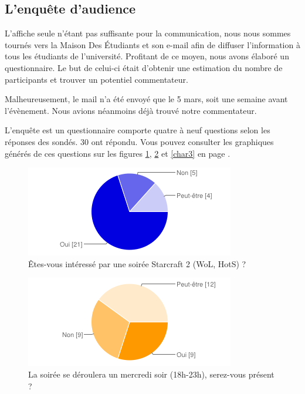 \subsection{L'enquête d'audience}%
\label{sub:l_enquete_d_audience}

L'affiche seule n'étant pas suffisante pour la communication, nous nous sommes tournés vers la
Maison Des Étudiants et son e-mail afin de diffuser l'information à tous les étudiants de l'université.
Profitant de ce moyen, nous avons élaboré un questionnaire. Le but de celui-ci était d'obtenir une estimation
du nombre de participants et trouver un potentiel commentateur.

Malheureusement, le mail n'a été envoyé que le 5 mars, soit une semaine avant l'évènement.
Nous avions néanmoins déjà trouvé notre commentateur.

L'enquête est un questionnaire comporte quatre à neuf questions selon
les réponses des sondés. 30 ont répondu.  Vous pouvez consulter les
graphiques générés de ces questions sur les figures \ref{char1},
\ref{char2} et \ref{char3} en page \pageref{char1}.

\begin{figure}
  \begin{center}
    \includegraphics[scale=1]{images/chart_1.png}
    \caption{Êtes-vous intéressé par une soirée Starcraft 2 (WoL, HotS) ?}
    \label{char1}
  \end{center}
\end{figure}

\begin{figure}
  \begin{center}
    \includegraphics[scale=1]{images/chart_2.png}
    \caption{La soirée se déroulera un mercredi soir (18h-23h), serez-vous présent ?}
    \label{char2}
  \end{center}
\end{figure}

